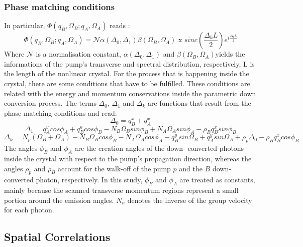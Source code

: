 \subsubsection{Phase matching conditions}
In particular, $\Phi(q_B,\Omega_B;q_A,\Omega_A)$ reads \cite{spatiocorrelations}:
\begin{equation}
\label{eq:mode}
\Phi(q_B,\Omega_B;q_A,\Omega_A) = \mathcal{N} \alpha(\Delta_0,\Delta_1) \beta(\Omega_B,\Omega_A) \text{ x }
sinc \left( \frac{\Delta_k L}{2} \right) e^{i \frac{\Delta_k L}{2}}
\end{equation}
Where $\mathcal{N}$ is a normalisation constant, $\alpha(\Delta_0,\Delta_1)$
and $\beta(\Omega_B,\Omega_A)$yields the informations of the pump's transverse 
and spectral distribution, respectively, L is the length of the nonlinear crystal.
For the process that is happening inside the crystal, there are some conditions that have to be fulfilled. These conditions are related with the energy and momentum conservations inside the parametric down conversion process.
The terms $\Delta_0$, $\Delta_1$ and $\Delta_k$ are functions that result from the phase matching conditions and read:
\begin{equation}
\Delta_0=q_B^x + q_A^x
\end{equation}
\begin{equation}
\Delta_1= q_A^y cos\phi_A + q_B^y cos\phi_B - N_B \Omega_B sin\phi_B + N_A \Omega_A sin\phi_A - \rho_B q_B^x sin\phi_B 
\end{equation}
\begin{equation}
\Delta_k=N_p(\Omega_B+\Omega_A)-N_B\Omega_B cos\phi_B - N_A\Omega_A cos\phi_A -q_B^y sin\Omega_B + q_A^y sin\Omega_A + \rho_p \Delta_0 - \rho_B q_B^x cos\phi_B
\end{equation}
The angles $\phi_B$ and $\phi_A$ are the creation angles of the down-
converted photons inside the crystal with respect to the pump’s
propagation direction, whereas the angles $\rho_p$ and $\rho_B$ account for
the walk-off of the pump $p$ and the $B$ down-
converted photon, respectively. 
In this study, $\phi_B$ and $\phi_A$ are treated as constants, 
mainly because the scanned transverse momentum regions represent a small portion around
the emission angles. $N_n$ denotes the inverse of the group velocity for each photon.



\subsection{Spatial Correlations}

